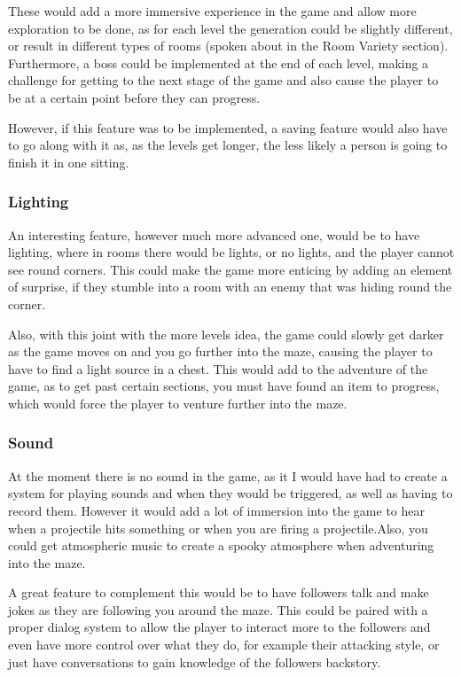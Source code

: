 \documentclass[../Main.tex]{subfiles}
\begin{document}
            These would add a more immersive experience in the game and allow more exploration to be done, as for each level the generation could be slightly different, or result in different types of rooms (spoken about in the Room Variety section). Furthermore, a boss could be implemented at the end of each level, making a challenge for getting to the next stage of the game and also cause the player to be at a certain point before they can progress.

            However, if this feature was to be implemented, a saving feature would also have to go along with it as, as the levels get longer, the less likely a person is going to finish it in one sitting.

        \subsubsection{Lighting}
            An interesting feature, however much more advanced one, would be to have lighting, where in rooms there would be lights, or no lights, and the player cannot see round corners. This could make the game more enticing by adding an element of surprise, if they stumble into a room with an enemy that was hiding round the corner.

            Also, with this joint with the more levels idea, the game could slowly get darker as the game moves on and you go further into the maze, causing the player to have to find a light source in a chest. This would add to the adventure of the game, as to get past certain sections, you must have found an item to progress, which would force the player to venture further into the maze.

        \subsubsection{Sound}
            At the moment there is no sound in the game, as it I would have had to create a system for playing sounds and when they would be triggered, as well as having to record them. However it would add a lot of immersion into the game to hear when a projectile hits something or when you are firing a projectile.Also, you could get atmospheric music to create a spooky atmosphere when adventuring into the maze.

            A great feature to complement this would be to have followers talk and make jokes as they are following you around the maze. This could be paired with a proper dialog system to allow the player to interact more to the followers and even have more control over what they do, for example their attacking style, or just have conversations to gain knowledge of the followers backstory.
\end{document}

